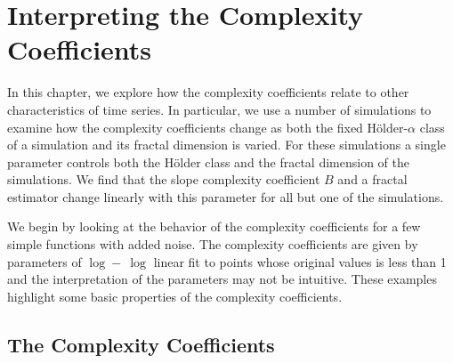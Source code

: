 \chapter{Interpreting the Complexity Coefficients} 

In this chapter, we explore how the complexity coefficients relate 
to other characteristics of time series. In particular, we use a 
number of simulations to examine how the  
complexity coefficients change as both the
 fixed H\"older-$\alpha$ class
of a simulation and its fractal dimension 
is varied.
For these simulations a single parameter controls both the 
H\"older class and the fractal dimension of the simulations. 
We find that the slope complexity coefficient $B$ and a fractal 
estimator change linearly with this parameter for all but 
one of the simulations.

We begin by looking at the behavior of
the complexity coefficients for a few simple functions with added 
noise. The complexity coefficients are given by parameters of $\log-\
\log$ linear fit to points whose original values is less than 1 and 
the interpretation of the parameters may not be intuitive. These 
examples highlight some basic properties of the complexity coefficients.  

\section{The Complexity Coefficients}


